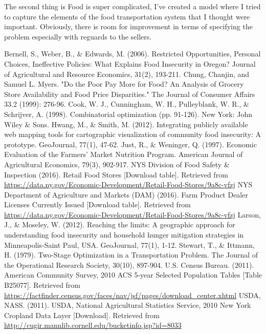 \documentclass{report}
\begin{document}
The second thing is Food is super complicated, I've created a model where I tried to capture the elements of the food transportation system that I thought were important. Obviously, there is room for improvement in terms of specifying the problem especially with reguards to the sellers.

\pagebreak

\begin{thebibliography}{99}
Bernell, S., Weber, B., {\&} Edwards, M. (2006). Restricted Opportunities, Personal Choices, Ineffective Policies: What Explains Food Insecurity in Oregon? Journal of Agricultural and Resource Economics, 31(2), 193-211. 
 Chung, Chanjin, and Samuel L. Myers. "Do the Poor Pay More for Food? An Analysis of Grocery Store Availability and Food Price Disparities." The Journal of Consumer Affairs 33.2 (1999): 276-96.
 Cook, W. J., Cunningham, W. H., Pulleyblank, W. R.,  {\&}  Schrijver, A. (1998). Combinatorial optimization (pp. 91-126). New York: John Wiley  {\&}  Sons.
 Hwang, M., {\&} Smith, M. (2012). Integrating publicly available web mapping tools for cartographic visualization of community food insecurity: A prototype. GeoJournal, 77(1), 47-62.
 Just, R., {\&} Weninger, Q. (1997). Economic Evaluation of the Farmers' Market Nutrition Program. American Journal of Agricultural Economics, 79(3), 902-917.
 NYS Division of Food Safety {\&} Inspection (2016). Retail Food Stores [Download table]. Retrieved from \url{https://data.ny.gov/Economic-Development/Retail-Food-Stores/9a8c-vfzj}
 NYS Department of Agriculture and Markets (DAM) (2016). Farm Product Dealer Licenses Currently Issued [Download table]. Retrieved from \url{https://data.ny.gov/Economic-Development/Retail-Food-Stores/9a8c-vfzj}
 Larson, J., {\&} Moseley, W. (2012). Reaching the limits: A geographic approach for understanding food insecurity and household hunger mitigation strategies in Minneapolis-Saint Paul, USA. GeoJournal, 77(1), 1-12.
 Stewart, T., {\&} Ittmann, H. (1979). Two-Stage Optimization in a Transportation Problem. The Journal of the Operational Research Society, 30(10), 897-904.
 U.S. Census Bureau. (2011). American Community Survey, 2010 ACS 5-year Selected Population Tables [Table B25077]. Retrieved from \url{https://factfinder.census.gov/faces/nav/jsf/pages/download_center.xhtml}
 USDA, NASS. (2011). USDA, National Agricultural Statistics Service, 2010 New York Cropland Data Layer [Download]. Retrieved from \url{http://cugir.mannlib.cornell.edu/bucketinfo.jsp?id=8033}

\end{thebibliography}
\end{document}

